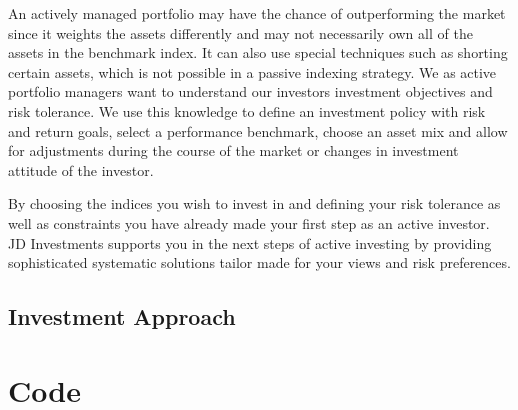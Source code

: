 \documentclass{scrreprt}
\begin{document}
An actively managed portfolio may have the chance of outperforming the market since it weights the assets differently and may not necessarily own all of the assets in the benchmark index.
It can also use special techniques such as shorting certain assets, which is not possible in a passive indexing strategy.
We as active portfolio managers want to understand our investors investment objectives and risk tolerance.
We use this knowledge to define an investment policy with risk and return goals, select a performance benchmark, choose an asset mix and allow for adjustments during the course of the market or changes in investment attitude of the investor.

By choosing the indices you wish to invest in and defining your risk tolerance as well as constraints you have already made your first step as an active investor.
JD Investments supports you in the next steps of active investing by providing sophisticated systematic solutions tailor made for your views and risk preferences.
 
\section*{Investment Approach}



\chapter*{Code}













\end{document}
